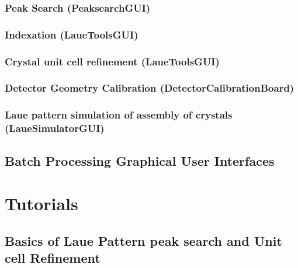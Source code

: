 \documentclass[letterpaper,10pt,english]{sphinxmanual}
\begin{document}
\subsection{Peak Search (PeaksearchGUI)}
\label{\detokenize{GUIs:peak-search-peaksearchgui}}

\subsection{Indexation (LaueToolsGUI)}
\label{\detokenize{GUIs:indexation-lauetoolsgui}}

\subsection{Crystal unit cell refinement (LaueToolsGUI)}
\label{\detokenize{GUIs:crystal-unit-cell-refinement-lauetoolsgui}}

\subsection{Detector Geometry Calibration (DetectorCalibrationBoard)}
\label{\detokenize{GUIs:detector-geometry-calibration-detectorcalibrationboard}}

\subsection{Laue pattern simulation of assembly of crystals (LaueSimulatorGUI)}
\label{\detokenize{GUIs:laue-pattern-simulation-of-assembly-of-crystals-lauesimulatorgui}}

\section{Batch Processing Graphical User Interfaces}
\label{\detokenize{GUIs:batch-processing-graphical-user-interfaces}}

\chapter{Tutorials}
\label{\detokenize{Tutorials::doc}}\label{\detokenize{Tutorials:tutorials}}\label{\detokenize{Tutorials:id1}}

\section{Basics of Laue Pattern peak search and Unit cell Refinement}
\label{\detokenize{Basic_PeakSearch_IndexRefine::doc}}\label{\detokenize{Basic_PeakSearch_IndexRefine:basics-of-laue-pattern-peak-search-and-unit-cell-refinement}}
\end{document}
